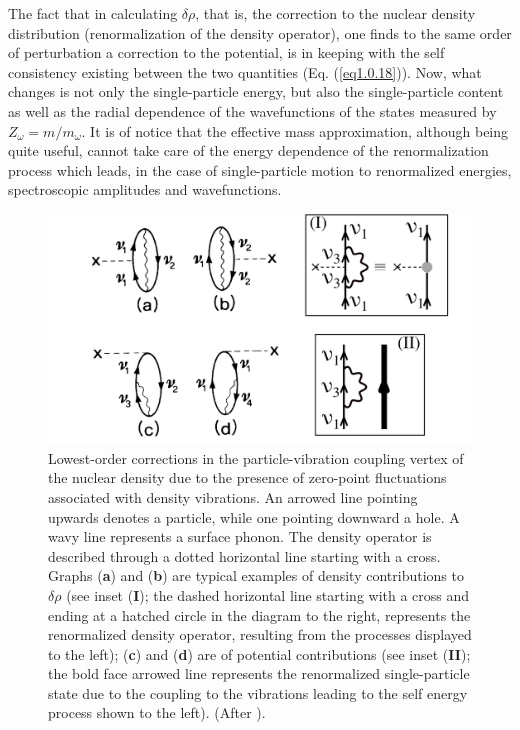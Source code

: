 \documentclass[a4paper,11pt]{book}
\numberwithin{equation}{section}
\numberwithin{figure}{section}
\numberwithin{table}{section}
\begin{document}
 The fact that in calculating $\delta\rho$, that is, the correction to the nuclear density distribution (renormalization of the density operator), one finds to the same order of perturbation a correction to the potential, is in keeping with the self consistency existing between the two quantities (Eq. (\ref{eq1.0.18})). Now, what changes is not only the single-particle energy, but also the single-particle content as well as the radial dependence of the wavefunctions of the states measured by $Z_\omega=m/m_\omega$. It is of notice that the effective mass approximation, although being quite useful, cannot take care of the energy dependence of the renormalization process which leads, in the case of single-particle motion to renormalized energies, spectroscopic amplitudes and wavefunctions. 
\begin{figure}
	\centerline {
		\includegraphics*[width=15cm, angle=0.]{introduccion/figs/fig0_8_1}
	}
	\caption{Lowest-order corrections in the particle-vibration coupling vertex of the nuclear density due to the presence of zero-point fluctuations associated with density vibrations. An arrowed line pointing upwards denotes a particle, while one pointing downward a hole. A wavy line represents a surface phonon. The density operator is described through a dotted horizontal line starting with a cross. Graphs (\textbf{a}) and (\textbf{b}) are typical examples of density contributions to $\delta\rho$ (see inset (\textbf{I}); the dashed horizontal line starting with a cross and ending at a hatched circle in the diagram to the right, represents the renormalized density operator, resulting from the processes displayed to the left); (\textbf{c}) and (\textbf{d}) are of potential contributions (see inset (\textbf{II}); the bold face arrowed line represents the renormalized single-particle state due to the coupling to the vibrations leading to the self energy process shown to the left). (After \cite{Barranco:87a}). }
	\label{fig0.5.1}
\end{figure}
\end{document}
